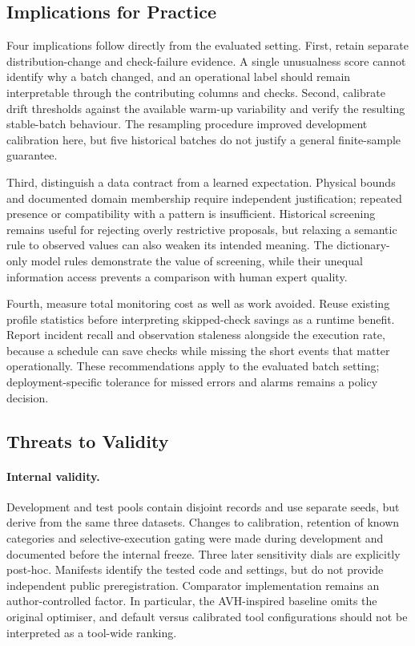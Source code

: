 \subsection{Implications for Practice}

Four implications follow directly from the evaluated setting. First, retain separate distribution-change and check-failure evidence. A single unusualness score cannot identify why a batch changed, and an operational label should remain interpretable through the contributing columns and checks. Second, calibrate drift thresholds against the available warm-up variability and verify the resulting stable-batch behaviour. The resampling procedure improved development calibration here, but five historical batches do not justify a general finite-sample guarantee.

Third, distinguish a data contract from a learned expectation. Physical bounds and documented domain membership require independent justification; repeated presence or compatibility with a pattern is insufficient. Historical screening remains useful for rejecting overly restrictive proposals, but relaxing a semantic rule to observed values can also weaken its intended meaning. The dictionary-only model rules demonstrate the value of screening, while their unequal information access prevents a comparison with human expert quality.

Fourth, measure total monitoring cost as well as work avoided. Reuse existing profile statistics before interpreting skipped-check savings as a runtime benefit. Report incident recall and observation staleness alongside the execution rate, because a schedule can save checks while missing the short events that matter operationally. These recommendations apply to the evaluated batch setting; deployment-specific tolerance for missed errors and alarms remains a policy decision.

\subsection{Threats to Validity}

\paragraph{Internal validity.} Development and test pools contain disjoint records and use separate seeds, but derive from the same three datasets. Changes to calibration, retention of known categories and selective-execution gating were made during development and documented before the internal freeze. Three later sensitivity dials are explicitly post-hoc. Manifests identify the tested code and settings, but do not provide independent public preregistration. Comparator implementation remains an author-controlled factor. In particular, the AVH-inspired baseline omits the original optimiser, and default versus calibrated tool configurations should not be interpreted as a tool-wide ranking.

